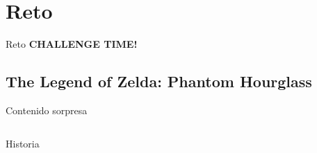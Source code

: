 \section{Reto}
\begin{frame}{Reto}
    \Huge\centering\textbf{CHALLENGE TIME!}
\end{frame}

\subsection{The Legend of Zelda: Phantom Hourglass}
\begin{frame}[t]{Contenido sorpresa}
    \begin{columns}
    \begin{column}[T]{0.5\textwidth}
        \centering
    \end{column}
    \hfill
    \begin{column}[T]{0.5\textwidth}
        \centering
    \end{column}
    \end{columns}
\end{frame}

\begin{frame}{Historia}
\end{frame}
